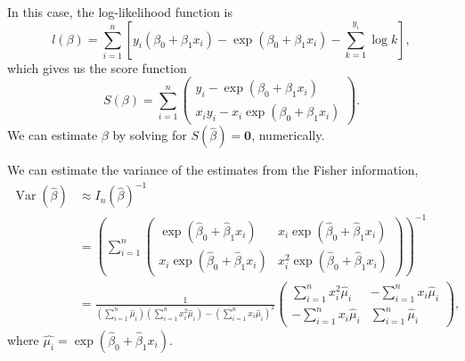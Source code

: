 \documentclass[letterpaper,11pt]{article}
\begin{document}
\begin{enumerate}
\begin{description}
    In this case, the log-likelihood function is
    \begin{equation}
      l\left(\beta\right) =
      \sum_{i=1}^n\left[
        y_i\left(\beta_0 + \beta_1x_i\right) -
        \exp\left(\beta_0 + \beta_1x_i\right) -
        \sum_{k=1}^{y_i}\log k
      \right],
    \end{equation}
    which gives us the score function
    \begin{equation}
      S\left(\beta\right) = \sum_{i=1}^n\begin{pmatrix}
        y_i - \exp\left(\beta_0 + \beta_1x_i\right) \\
        x_iy_i - x_i\exp\left(\beta_0 + \beta_1x_i\right)
      \end{pmatrix}.
    \end{equation}
    We can estimate $\beta$ by solving for
    $S\left(\hat{\beta}\right) = \mathbf{0}$, numerically.

    We can estimate the variance of the estimates from the Fisher information,
    \begin{align}
      \operatorname{Var}\left(
      \hat{\beta}
      \right)
      &\approx
        I_n\left(\hat{\beta}\right)^{-1} \nonumber\\
      &= \left(
        \sum_{i=1}^n\begin{pmatrix}
          \exp\left(\hat{\beta}_0 + \hat{\beta}_1x_i\right) &
          x_i\exp\left(\hat{\beta}_0 + \hat{\beta}_1x_i\right) \\
          x_i\exp\left(\hat{\beta}_0 + \hat{\beta}_1x_i\right) &
          x_i^2\exp\left(\hat{\beta}_0 + \hat{\beta}_1x_i\right)
        \end{pmatrix} \right)^{-1}  \nonumber\\
      &= \frac{1}{
        \left(\sum_{i=1}^n \hat{\mu}_i\right)\left(\sum_{i=1}^n x_i^2\hat{\mu}_i\right)
        - \left(\sum_{i=1}^n x_i\hat{\mu}_i\right)^2}
        \begin{pmatrix}
          \sum_{i=1}^n x_i^2\hat{\mu}_i &
          -\sum_{i=1}^n x_i\hat{\mu}_i \\
          -\sum_{i=1}^n x_i\hat{\mu}_i &
          \sum_{i=1}^n \hat{\mu}_i
        \end{pmatrix}, \label{eqn:p2_beta_hat_variance}                                         
    \end{align}
    where $\hat{\mu_i} = \exp\left(\hat{\beta}_0 + \hat{\beta}_1x_i\right)$.
    
    
  \end{description}
\end{enumerate}
\end{document}
